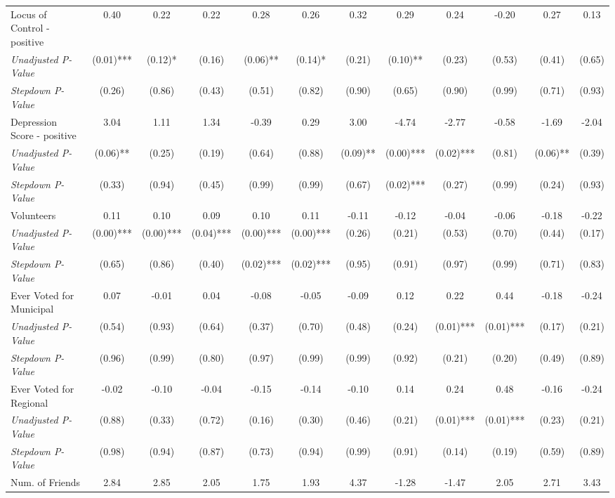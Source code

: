 \begin{tabular}{l c c c c c c c c c c c}
Locus of Control - positive & 0.40 & 0.22 & 0.22 & 0.28 & 0.26 & 0.32 & 0.29 & 0.24 & -0.20 & 0.27 & 0.13 \\
\quad \textit{Unadjusted P-Value} & (0.01)*** & (0.12)* & (0.16) & (0.06)** & (0.14)* & (0.21) & (0.10)** & (0.23) & (0.53) & (0.41) & (0.65) \\
\quad \textit{Stepdown P-Value} & (0.26) & (0.86) & (0.43) & (0.51) & (0.82) & (0.90) & (0.65) & (0.90) & (0.99) & (0.71) & (0.93) \\
Depression Score - positive & 3.04 & 1.11 & 1.34 & -0.39 & 0.29 & 3.00 & -4.74 & -2.77 & -0.58 & -1.69 & -2.04 \\
\quad \textit{Unadjusted P-Value} & (0.06)** & (0.25) & (0.19) & (0.64) & (0.88) & (0.09)** & (0.00)*** & (0.02)*** & (0.81) & (0.06)** & (0.39) \\
\quad \textit{Stepdown P-Value} & (0.33) & (0.94) & (0.45) & (0.99) & (0.99) & (0.67) & (0.02)*** & (0.27) & (0.99) & (0.24) & (0.93) \\
Volunteers & 0.11 & 0.10 & 0.09 & 0.10 & 0.11 & -0.11 & -0.12 & -0.04 & -0.06 & -0.18 & -0.22 \\
\quad \textit{Unadjusted P-Value} & (0.00)*** & (0.00)*** & (0.04)*** & (0.00)*** & (0.00)*** & (0.26) & (0.21) & (0.53) & (0.70) & (0.44) & (0.17) \\
\quad \textit{Stepdown P-Value} & (0.65) & (0.86) & (0.40) & (0.02)*** & (0.02)*** & (0.95) & (0.91) & (0.97) & (0.99) & (0.71) & (0.83) \\
Ever Voted for Municipal & 0.07 & -0.01 & 0.04 & -0.08 & -0.05 & -0.09 & 0.12 & 0.22 & 0.44 & -0.18 & -0.24 \\
\quad \textit{Unadjusted P-Value} & (0.54) & (0.93) & (0.64) & (0.37) & (0.70) & (0.48) & (0.24) & (0.01)*** & (0.01)*** & (0.17) & (0.21) \\
\quad \textit{Stepdown P-Value} & (0.96) & (0.99) & (0.80) & (0.97) & (0.99) & (0.99) & (0.92) & (0.21) & (0.20) & (0.49) & (0.89) \\
Ever Voted for Regional & -0.02 & -0.10 & -0.04 & -0.15 & -0.14 & -0.10 & 0.14 & 0.24 & 0.48 & -0.16 & -0.24 \\
\quad \textit{Unadjusted P-Value} & (0.88) & (0.33) & (0.72) & (0.16) & (0.30) & (0.46) & (0.21) & (0.01)*** & (0.01)*** & (0.23) & (0.21) \\
\quad \textit{Stepdown P-Value} & (0.98) & (0.94) & (0.87) & (0.73) & (0.94) & (0.99) & (0.91) & (0.14) & (0.19) & (0.59) & (0.89) \\
Num. of Friends & 2.84 & 2.85 & 2.05 & 1.75 & 1.93 & 4.37 & -1.28 & -1.47 & 2.05 & 2.71 & 3.43 \\

\end{tabular}
